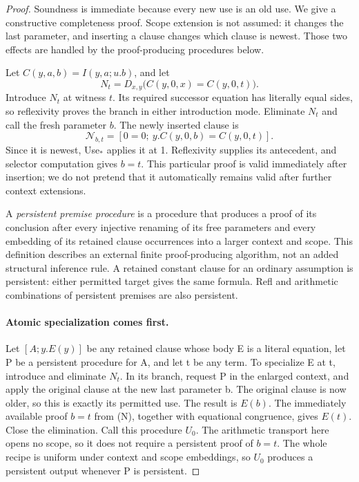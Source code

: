 \documentclass[11pt,letterpaper]{article}
\theoremstyle{definition}
\begin{document}
\begin{proof}
Soundness is immediate because every new use is an old use.  We give a
constructive completeness proof.  Scope extension is not assumed: it
changes the last parameter, and inserting a clause changes which clause
is newest.  Those two effects are handled by the proof-producing
procedures below.

Let \(C(y,a,b)=I(y,a;u.b)\), and let
\[
 N_t=D_{x,y}\bigl(C(y,0,x)=C(y,0,t)\bigr).
 \tag{Name}
\]
Introduce \(N_t\) at witness \(t\).  Its required successor equation
has literally equal sides, so reflexivity proves the branch in either
introduction mode.  Eliminate \(N_t\) and call the fresh parameter
\(b\).  The newly inserted clause is
\[
 \mathcal N_{b,t}=[0=0;\ y.C(y,0,b)=C(y,0,t)].
 \tag{N}
\]
Since it is newest, Use$_*$ applies it at 1.  Reflexivity supplies its
antecedent, and selector computation gives \(b=t\).  This particular
proof is valid immediately after insertion; we do not pretend that it
automatically remains valid after further context extensions.

A \emph{persistent premise procedure} is a procedure that produces a
proof of its conclusion after every injective renaming of its free
parameters and every embedding of its retained clause occurrences into
a larger context and scope.  This definition describes an external
finite proof-producing algorithm, not an added structural inference
rule.  A retained constant clause for an ordinary assumption is
persistent: either permitted target gives the same formula.  Refl and
arithmetic combinations of persistent premises are also persistent.

\paragraph{Atomic specialization comes first.}
Let \([A;y.E(y)]\) be any retained clause whose body E is a literal
equation, let P be a persistent procedure for A, and let t be any term.
To specialize E at t, introduce and eliminate \(N_t\).  In its branch,
request P in the enlarged context, and apply the original clause at the
new last parameter b.  The original clause is now older, so this is
exactly its permitted use.  The result is \(E(b)\).  The immediately
available proof \(b=t\) from (N), together with equational congruence,
gives \(E(t)\).  Close the elimination.  Call this procedure \(U_0\).
The arithmetic transport here opens no scope, so it does not require a
persistent proof of \(b=t\).  The whole recipe is uniform under context
and scope embeddings, so \(U_0\) produces a persistent output whenever
P is persistent.


\end{proof}
\end{document}
